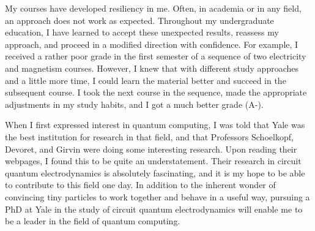 {    My courses have developed resiliency in me. Often, in academia or in any
    field, an approach does not work as expected. Throughout my undergraduate
    education, I have learned to accept these unexpected results, reassess my
    approach, and proceed in a modified direction with confidence.  For
    example, I received a rather poor grade in the first semester of a sequence
    of two electricity and magnetism courses. However, I knew that with
    different study approaches and a little more time, I could learn the
    material better and succeed in the subsequent course. I took the next
    course in the sequence, made the appropriate adjustments in my study
    habits, and I got a much better grade (A-).

    When I first expressed interest in quantum computing, I was told that Yale
    was the best institution for research in that field, and that Professors
    Schoelkopf, Devoret, and Girvin were doing some interesting research. Upon
    reading their webpages, I found this to be quite an understatement. Their
    research in circuit quantum electrodynamics is absolutely fascinating, and
    it is my hope to be able to contribute to this field one day. In addition
    to the inherent wonder of convincing tiny particles to work together and
    behave in a useful way, pursuing a PhD at Yale in the study of circuit
    quantum electrodynamics will enable me to be a leader in the field
    of quantum computing.
}



